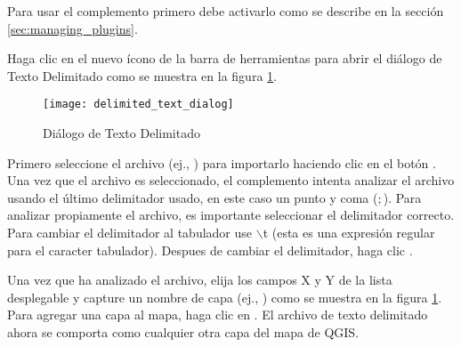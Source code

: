 Para usar el complemento primero debe activarlo como se describe en la sección \ref{sec:managing_plugins}.

Haga clic en el nuevo ícono de la barra de herramientas  para abrir el diálogo de Texto Delimitado como se muestra en la figura \ref{fig:delim_text_plugin_dialog}.

\begin{figure}[ht]
   \begin{center}
   \caption{Diálogo de Texto Delimitado \nixcaption}\label{fig:delim_text_plugin_dialog}\smallskip
   \texttt{[image: delimited\_text\_dialog]}
   \end{center}  
\end{figure}

Primero seleccione el archivo (ej., ) para importarlo haciendo clic en el botón . Una vez que el archivo es seleccionado, el complemento intenta analizar el archivo usando el último delimitador usado, en este caso un punto y coma (\mbox{$;$}). Para analizar propiamente el archivo, es importante seleccionar el delimitador correcto. Para cambiar el delimitador al tabulador use 
\mbox{$\backslash$}t (esta es una expresión regular para el caracter tabulador).
Despues de cambiar el delimitador, haga clic .

Una vez que ha analizado el archivo, elija los campos X y Y de la lista desplegable y capture un nombre de capa (ej.,  ) como se muestra en la figura 
\ref{fig:delim_text_plugin_dialog}. Para agregar una capa al mapa, haga clic en
. El archivo de texto delimitado ahora se comporta como cualquier otra capa del mapa de QGIS.

